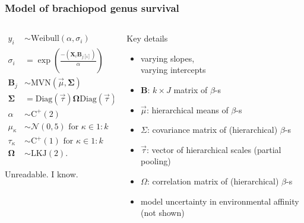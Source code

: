 \documentclass{beamer}
\begin{document}
\begin{frame}
  \frametitle{Model of brachiopod genus survival}
 
  \begin{columns}
    \begin{column}{0.5\textwidth}
      \begin{align*}
        y_{i} &\sim \mathrm{Weibull}(\alpha, \sigma_{i}) \\
        \sigma_{i} &= \exp\left(\frac{-(\mathbf{X}_{i} \mathbf{B}_{j[i]})}{\alpha}\right) \\
        \mathbf{B}_{j} &\sim \mathrm{MVN}(\vec{\mu}, \mathbf{\Sigma}) \\
        \mathbf{\Sigma} &= \text{Diag}(\vec{\tau}) \mathbf{\Omega} \text{Diag}(\vec{\tau}) \\
        \alpha &\sim \mathrm{C^{+}}(2) \\
        \mu_{\kappa} &\sim \mathcal{N}(0, 5) \text{ for } \kappa \in 1:k \\
        \tau_{\kappa} &\sim \mathrm{C^{+}}(1) \text{ for } \kappa \in 1:k \\
        \mathbf{\Omega} &\sim \text{LKJ}(2).
      \end{align*}

      \bigskip

      \footnotesize{Unreadable. I know.}
    \end{column}
    \begin{column}{0.5\textwidth}
      Key details
      \begin{itemize}
        \item varying slopes, \\varying intercepts
        \item \(\mathbf{B}\): \(k \times J\) matrix of \(\beta\)-s
        \item \(\vec{\mu}\): hierarchical means of \(\beta\)-s
        \item \(\Sigma\): covariance matrix of (hierarchical) \(\beta\)-s
        \item \(\vec{\tau}\): vector of hierarchical scales (partial pooling)
        \item \(\Omega\): correlation matrix of (hierarchical) \(\beta\)-s
        \item model uncertainty in environmental affinity \\(not shown)
      \end{itemize}

    \end{column}
  \end{columns}
\end{frame}
\end{document}

